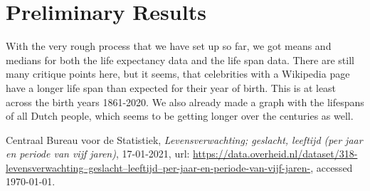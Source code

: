\documentclass{article}
\begin{document}
\section{Preliminary Results}

With the very rough process that we have set up so far, we got means and medians for both the life expectancy data and the life span data. There are still many critique points here, but it seems, that celebrities with a Wikipedia page have a longer life span than expected for their year of birth. This is at least across the birth years 1861-2020. We also already made a graph with the lifespans of all Dutch people, which seems to be getting longer over the centuries as well.

\begin{thebibliography}	{}


 Centraal Bureau voor de Statistiek, \textit{Levensverwachting; geslacht, leeftijd (per jaar en periode van vijf jaren)}, 17-01-2021, url:
\href{https://data.overheid.nl/dataset/318-levensverwachting--geslacht--leeftijd--per-jaar-en-periode-van-vijf-jaren-}{https://data.overheid.nl/dataset/318-levensverwachting--geslacht--leeftijd--per-jaar-en-periode-van-vijf-jaren-}, accessed {\today}. 

\bibitem{}


\end{thebibliography}
\end{document}
